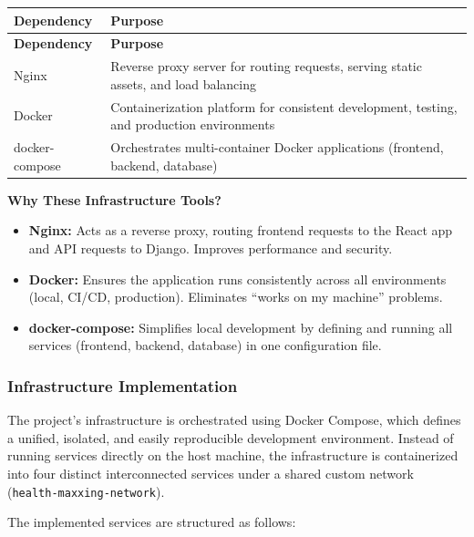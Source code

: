 \begin{longtable}{L{3.6cm} L{10.8cm}}
  \color{white}\bfseries Dependency &
  \color{white}\bfseries Purpose \\
  \endfirsthead
  \color{white}\bfseries Dependency &
  \color{white}\bfseries Purpose \\
  \endhead
  Nginx & Reverse proxy server for routing requests, serving static assets, and load balancing \\
  Docker & Containerization platform for consistent development, testing, and production environments \\
  docker-compose & Orchestrates multi-container Docker applications (frontend, backend, database) \\
\end{longtable}

\textbf{Why These Infrastructure Tools?}

\begin{itemize}
  \item \textbf{Nginx:} Acts as a reverse proxy, routing frontend requests to the React app and API requests to Django. Improves performance and security.
  \item \textbf{Docker:} Ensures the application runs consistently across all environments (local, CI/CD, production). Eliminates ``works on my machine'' problems.
  \item \textbf{docker-compose:} Simplifies local development by defining and running all services (frontend, backend, database) in one configuration file.
\end{itemize}

\subsubsection{Infrastructure Implementation}

The project's infrastructure is orchestrated using Docker Compose, which defines a unified, isolated, and easily reproducible development environment. Instead of running services directly on the host machine, the infrastructure is containerized into four distinct interconnected services under a shared custom network (\texttt{health-maxxing-network}).

The implemented services are structured as follows:

